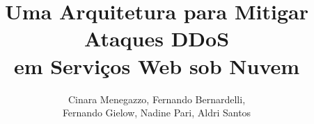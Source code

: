 \documentclass[a4paper, 12pt]{article}
\begin{document}
\title{Uma Arquitetura para Mitigar Ataques DDoS\\ em Serviços Web sob Nuvem}


\author{
Cinara Menegazzo, Fernando Bernardelli, \\
Fernando Gielow, Nadine Pari, Aldri Santos
}
   
\address{Departamento de Informática -- Universidade Federal do Paraná\\
NR2 - Núcleo de Redes Sem Fio e Redes Avançadas -- Curitiba -- Brasil
}     

\maketitle
\end{document}
